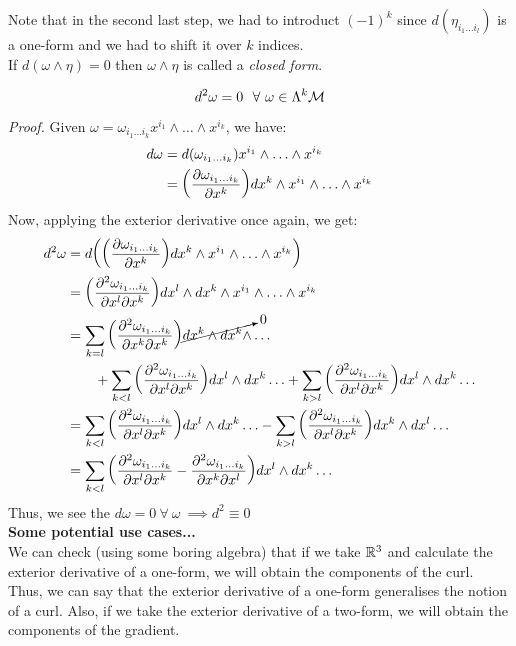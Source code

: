 Note that in the second last step, we had to introduct $(-1)^k$ since $d(\eta_{i_1\ldots i_l})$ is a one-form and we had to shift it over $k$ indices. \\[0.2cm]
If $d(\omega\wedge \eta) =0$ then $\omega\wedge \eta$ is called a \textit{closed form}. 
\begin{lemma}
   $$ d^2\omega = 0 \ \ \forall \ \omega \in \Lambda^k\mathcal M$$
\end{lemma}
\textit{Proof.} Given $\omega =\omega_{i_1\ldots i_k}x^{i_1}\wedge \ldots \wedge x^{i_k}$, we have:
\begin{align*}
    d\omega &= d(\omega_{i_1\ldots i_k}) x^{i_1}\wedge \ldots \wedge x^{i_k}\\
    &=\qty(\pdv{\omega_{i_1\ldots i_k}}{x^k})dx^k\wedge x^{i_1}\wedge \ldots \wedge x^{i_k}
\end{align*}
Now, applying the exterior derivative once again, we get:
\begin{align*}
    d^2\omega &= d\qty(\qty(\pdv{\omega_{i_1\ldots i_k}}{x^k})dx^k\wedge x^{i_1}\wedge \ldots \wedge x^{i_k})\\
    &=\qty(\pdv{\omega_{i_1\ldots i_k}}{x^l}{x^k})dx^l\wedge dx^k\wedge x^{i_1}\wedge \ldots \wedge x^{i_k}\\
    &=\sum\limits_{k=l}\qty(\pdv{\omega_{i_1\ldots i_k}}{x^k}{x^k})\cancelto{0}{dx^k\wedge dx^k\wedge} \ldots \\
    &\qquad +\sum\limits_{k<l} \qty(\pdv{\omega_{i_1\ldots i_k}}{x^l}{x^k})dx^l\wedge dx^k \ldots + \sum\limits_{k>l} \qty(\pdv{\omega_{i_1\ldots i_k}}{x^l}{x^k})dx^l\wedge dx^k\ldots \\
    &=\sum\limits_{k<l} \qty(\pdv{\omega_{i_1\ldots i_k}}{x^l}{x^k})dx^l\wedge dx^k \ldots - \sum\limits_{k>l} \qty(\pdv{\omega_{i_1\ldots i_k}}{x^l}{x^k})dx^k\wedge dx^l\ldots\\
    &=\sum\limits_{k<l} \qty(\pdv{\omega_{i_1\ldots i_k}}{x^l}{x^k} - \pdv{\omega_{i_1\ldots i_k}}{x^k}{x^l})dx^l\wedge dx^k \ldots
\end{align*}
Thus, we see the $d\omega = 0\ \forall \ \omega\  \implies d^2 \equiv 0$\\[0.2cm]
\textbf{Some potential use cases...}\\[0.2cm]
We can check (using some boring algebra) that if we take $\mathbb{R}^3$ and calculate the exterior derivative of a one-form, we will obtain the components of the curl. Thus, we can say that the exterior derivative of a one-form generalises the notion of a curl. Also, if we take the exterior derivative of a two-form, we will obtain the components of the gradient. \\[0.2cm]
